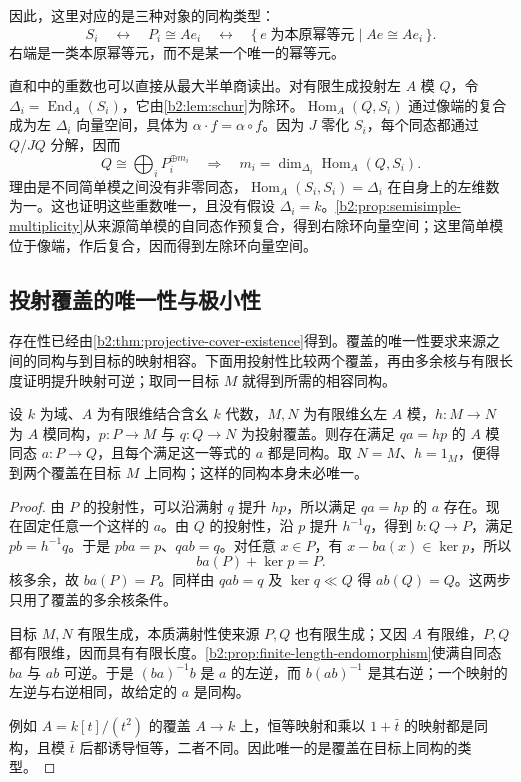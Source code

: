因此，这里对应的是三种对象的同构类型：
\[
	S_i\quad\longleftrightarrow\quad P_i\cong Ae_i \quad\longleftrightarrow\quad \{\,e\;\text{为本原幂等元}\mid Ae\cong Ae_i\,\}.
\]
右端是一类本原幂等元，而不是某一个唯一的幂等元。

\ProseParagraphBreak
直和中的重数也可以直接从最大半单商读出。对有限生成投射左 \(A\) 模 \(Q\)，令 \(\Delta_i=\operatorname{End}_A(S_i)\)，它由\cref{b2:lem:schur}为除环。\(\operatorname{Hom}_A(Q,S_i)\) 通过像端的复合成为左 \(\Delta_i\) 向量空间，具体为 \(\alpha\cdot f=\alpha\circ f\)。因为 \(J\) 零化 \(S_i\)，每个同态都通过 \(Q/JQ\) 分解，因而
\begin{equation}\label{b2:eq:projective-simple-multiplicity}
	Q\cong\bigoplus_iP_i^{\oplus m_i} \quad\Longrightarrow\quad m_i=\dim_{\Delta_i}\operatorname{Hom}_A(Q,S_i).
\end{equation}
理由是不同简单模之间没有非零同态，\(\operatorname{Hom}_A(S_i,S_i)=\Delta_i\) 在自身上的左维数为一。这也证明这些重数唯一，且没有假设 \(\Delta_i=k\)。\cref{b2:prop:semisimple-multiplicity}从来源简单模的自同态作预复合，得到右除环向量空间；这里简单模位于像端，作后复合，因而得到左除环向量空间。

\subsection{投射覆盖的唯一性与极小性}
\label{b2:subsec:1503:06}

存在性已经由\cref{b2:thm:projective-cover-existence}得到。覆盖的唯一性要求来源之间的同构与到目标的映射相容。下面用投射性比较两个覆盖，再由多余核与有限长度证明提升映射可逆；取同一目标 \(M\) 就得到所需的相容同构。

\begin{theorem}\label{b2:thm:projective-cover-uniqueness}
	设 \(k\) 为域、\(A\) 为有限维结合含幺 \(k\) 代数，\(M,N\) 为有限维幺左 \(A\) 模，\(h:M\to N\) 为 \(A\) 模同构，\(p:P\to M\) 与 \(q:Q\to N\) 为投射覆盖。则存在满足 \(qa=hp\) 的 \(A\) 模同态 \(a:P\to Q\)，且每个满足这一等式的 \(a\) 都是同构。取 \(N=M\)、\(h=1_M\)，便得到两个覆盖在目标 \(M\) 上同构；这样的同构本身未必唯一。
\end{theorem}
\begin{proof}
	由 \(P\) 的投射性，可以沿满射 \(q\) 提升 \(hp\)，所以满足 \(qa=hp\) 的 \(a\) 存在。现在固定任意一个这样的 \(a\)。由 \(Q\) 的投射性，沿 \(p\) 提升 \(h^{-1}q\)，得到 \(b:Q\to P\)，满足 \(pb=h^{-1}q\)。于是 \(pba=p\)、\(qab=q\)。对任意 \(x\in P\)，有 \(x-ba(x)\in\ker p\)，所以
	\[
		ba(P)+\ker p=P.
	\]
	核多余，故 \(ba(P)=P\)。同样由 \(qab=q\) 及 \(\ker q\ll Q\) 得 \(ab(Q)=Q\)。这两步只用了覆盖的多余核条件。

	目标 \(M,N\) 有限生成，本质满射性使来源 \(P,Q\) 也有限生成；又因 \(A\) 有限维，\(P,Q\) 都有限维，因而具有有限长度。\cref{b2:prop:finite-length-endomorphism}使满自同态 \(ba\) 与 \(ab\) 可逆。于是 \((ba)^{-1}b\) 是 \(a\) 的左逆，而 \(b(ab)^{-1}\) 是其右逆；一个映射的左逆与右逆相同，故给定的 \(a\) 是同构。

	例如 \(A=k[t]/(t^2)\) 的覆盖 \(A\to k\) 上，恒等映射和乘以 \(1+\bar t\) 的映射都是同构，且模 \(\bar t\) 后都诱导恒等，二者不同。因此唯一的是覆盖在目标上同构的类型。
\end{proof}

